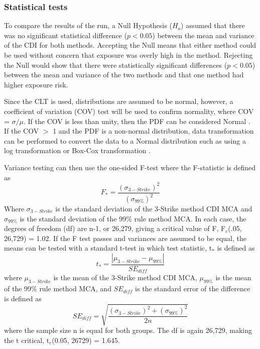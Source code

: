 \subsubsection{Statistical tests}

To compare the results of the run, a Null Hypothesis ($H_{o}$) assumed that there was no significant statistical difference ($p<0.05$) between the mean and variance of the CDI for both methods. Accepting the Null means that either method could be used without concern that exposure was overly high in the method. Rejecting the Null would show that there were statistically significant differences ($p<0.05$) between the mean and variance of the two methods and that one method had higher exposure risk. 

Since the CLT is used, distributions are assumed to be normal, however, a coefficient of variation (COV) test will be used to confirm normality, where COV = $\sigma/\mu$. If the COV is less than unity, then the PDF can be considered Normal \citep{Abdi2010}.  If the COV $>$ 1 and the PDF is a non-normal distribution, data transformation can be performed to convert the data to a Normal distribution such as using a log transformation or Box-Cox transformation \citep{Osborne2010}.

Variance testing can then use the one-sided F-test where the F-statistic is defined as
%
\begin{equation}
\label{eq6:ftest}
F_{*} = \frac{(\sigma_{3-Strike})^{2}}{(\sigma_{99\%})^{2}}
\end{equation}
%
Where $\sigma_{3-Strike}$ is the standard deviation of the 3-Strike method CDI MCA and $\sigma_{99\%}$ is the standard deviation of the 99\% rule method MCA. In each case, the degrees of freedom (df) are n-1, or 26,279, giving a critical value of F, F$_{c}$(.05, 26,729) = 1.02. If the F test passes and variances are assumed to be equal, the means can be tested with a standard t-test in which test statistic, t$_{*}$ is defined as
%
\begin{equation}
\label{eq7:t-test}
t_{*} = \frac{\left | \mu_{3-Strike}-\mu_{99\%} \right |}{SE_{diff}}
\end{equation}
%
\noindent
where $\mu_{3-Strike}$ is the mean of the 3-Strike method CDI MCA, $\mu_{99\%}$ is the mean of the 99\% rule method MCA, and $SE_{diff}$ is the standard error of the difference is defined as
%
\begin{equation}
\label{eq8:SEdiff}
SE_{diff} = \sqrt{\frac{(\sigma_{3-Strike})^{2}+(\sigma_{99\%})^{2}}{2n}}
\end{equation}
%
\noindent
where the sample size n is equal for both groups. The df is again 26,729, making the t critical, t$_{c}$(0.05, 26729) = 1.645.

